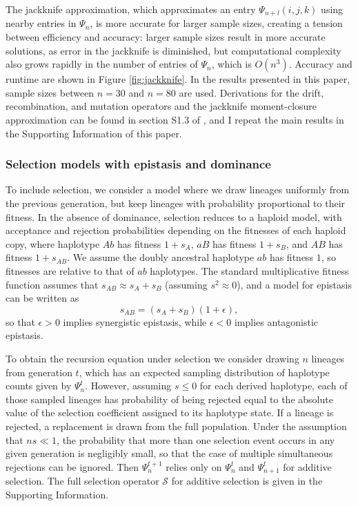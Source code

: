 \documentclass[]{article}
\begin{document}
The jackknife approximation, which approximates an entry \(\Psi_{n+l}(i,j,k)\)
using nearby entries in \(\Psi_n\), is more accurate for larger sample sizes,
creating a tension between efficiency and accuracy: larger sample sizes result
in more accurate solutions, as error in the jackknife is diminished, but
computational complexity also grows rapidly in the number of entries of
\(\Psi_n\), which is \(O(n^3)\). Accuracy and runtime are shown in Figure
\ref{fig:jackknife}. In the results presented in this paper, sample sizes
between \(n=30\) and \(n=80\) are used. Derivations for the drift, recombination,
and mutation operators and the jackknife moment-closure approximation can be
found in section S1.3 of \citet{Ragsdale2019-nt}, and I repeat the main results in the
Supporting Information of this paper.

\subsubsection{Selection models with epistasis and dominance}

To include selection, we consider a model where we draw lineages uniformly from
the previous generation, but keep lineages with probability proportional to
their fitness. In the absence of dominance, selection reduces to a haploid
model, with acceptance and rejection probabilities depending on the fitnesses
of each haploid copy, where haplotype \(Ab\) has fitness \(1 + s_{A}\), \(aB\)
has fitness \(1 + s_{B}\), and \(AB\) has fitness \(1 + s_{AB}\). We assume the
doubly ancestral haplotype \(ab\) has fitness \(1\), so fitnesses are relative
to that of \(ab\) haplotypes. The standard multiplicative fitness function
assumes that \(s_{AB} \approx s_{A} + s_{B}\) (assuming \(s^2\approx0\)), and a
model for epistasis can be written as \[s_{AB} = (s_{A} + s_{B}) (1 +
\epsilon),\] so that \(\epsilon > 0\) implies synergistic epistasis, while
\(\epsilon < 0\) implies antagonistic epistasis.

To obtain the recursion equation under selection we consider drawing \(n\)
lineages from generation \(t\), which has an expected sampling distribution of
haplotype counts given by \(\Psi_n^t\). However, assuming \(s\leq0\) for each
derived haplotype, each of those sampled lineages has probability of being
rejected equal to the absolute value of the selection coefficient assigned to
its haplotype state. If a lineage is rejected, a replacement is drawn from the
full population. Under the assumption that \(ns \ll 1\), the probability that
more than one selection event occurs in any given generation is negligibly
small, so that the case of multiple simultaneous rejections can be ignored.
Then \(\Psi_n^{t+1}\) relies only on \(\Psi_n^t\) and \(\Psi_{n+1}^t\) for
additive selection. The full selection operator \(\mathcal{S}\) for additive
selection is given in the Supporting Information.
\end{document}
